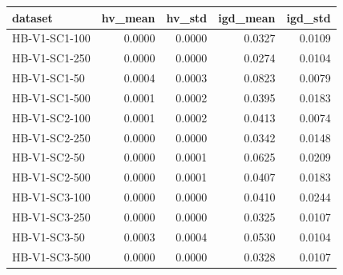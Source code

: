 \begin{tabular}{lrrrr}
\toprule
dataset & hv_mean & hv_std & igd_mean & igd_std \\
\midrule
HB-V1-SC1-100 & 0.0000 & 0.0000 & 0.0327 & 0.0109 \\
HB-V1-SC1-250 & 0.0000 & 0.0000 & 0.0274 & 0.0104 \\
HB-V1-SC1-50 & 0.0004 & 0.0003 & 0.0823 & 0.0079 \\
HB-V1-SC1-500 & 0.0001 & 0.0002 & 0.0395 & 0.0183 \\
HB-V1-SC2-100 & 0.0001 & 0.0002 & 0.0413 & 0.0074 \\
HB-V1-SC2-250 & 0.0000 & 0.0000 & 0.0342 & 0.0148 \\
HB-V1-SC2-50 & 0.0000 & 0.0001 & 0.0625 & 0.0209 \\
HB-V1-SC2-500 & 0.0000 & 0.0001 & 0.0407 & 0.0183 \\
HB-V1-SC3-100 & 0.0000 & 0.0000 & 0.0410 & 0.0244 \\
HB-V1-SC3-250 & 0.0000 & 0.0000 & 0.0325 & 0.0107 \\
HB-V1-SC3-50 & 0.0003 & 0.0004 & 0.0530 & 0.0104 \\
HB-V1-SC3-500 & 0.0000 & 0.0000 & 0.0328 & 0.0107 \\
\bottomrule
\end{tabular}
